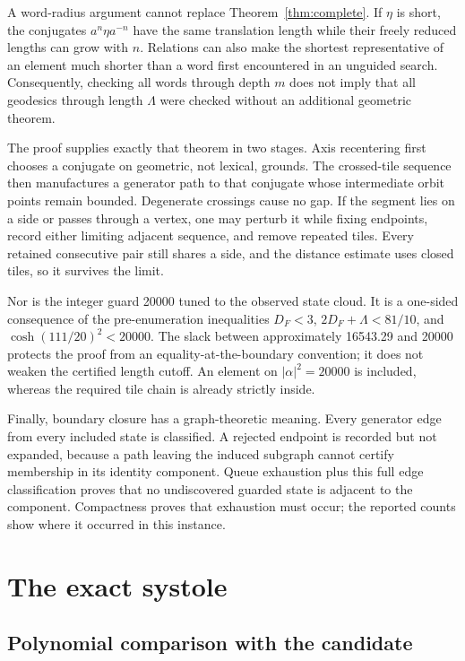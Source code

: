 \documentclass[11pt,a4paper]{article}
\theoremstyle{definition}
\begin{document}
A word-radius argument cannot replace Theorem~\ref{thm:complete}.  If
\(\eta\) is short, the conjugates \(a^n\eta a^{-n}\) have the same translation
length while their freely reduced lengths can grow with \(n\).  Relations can
also make the shortest representative of an element much shorter than a word
first encountered in an unguided search.  Consequently, checking all words
through depth \(m\) does not imply that all geodesics through length
\(\Lambda\) were checked without an additional geometric theorem.

The proof supplies exactly that theorem in two stages.  Axis recentering first
chooses a conjugate on geometric, not lexical, grounds.  The crossed-tile
sequence then manufactures a generator path to that conjugate whose
intermediate orbit points remain bounded.  Degenerate crossings cause no
gap.  If the segment lies on a side or passes through a vertex, one may
perturb it while fixing endpoints, record either limiting adjacent sequence,
and remove repeated tiles.  Every retained consecutive pair still shares a
side, and the distance estimate uses closed tiles, so it survives the limit.

Nor is the integer guard 20000 tuned to the observed state cloud.  It is a
one-sided consequence of the pre-enumeration inequalities
\(D_F<3\), \(2D_F+\Lambda<81/10\), and
\(\cosh(111/20)^2<20000\).  The slack between approximately 16543.29 and
20000 protects the proof from an equality-at-the-boundary convention; it does
not weaken the certified length cutoff.  An element on
\(|\alpha|^2=20000\) is included, whereas the required tile chain is already
strictly inside.

Finally, boundary closure has a graph-theoretic meaning.  Every generator edge
from every included state is classified.  A rejected endpoint is recorded but
not expanded, because a path leaving the induced subgraph cannot certify
membership in its identity component.  Queue exhaustion plus this full edge
classification proves that no undiscovered guarded state is adjacent to the
component.  Compactness proves that exhaustion must occur; the reported counts
show where it occurred in this instance.

\section{The exact systole}
\label{sec:systole}

\subsection{Polynomial comparison with the candidate}
\end{document}
